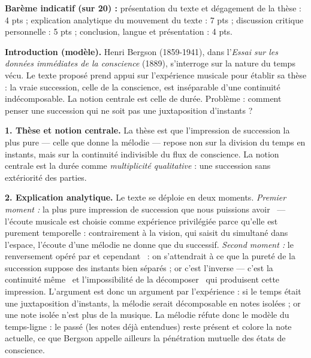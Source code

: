 \documentclass[11pt]{article}
\newcommand{\cle}[1]{{\popxbold\color{popdark}#1}}
\begin{document}
\begin{corrige}

\textbf{Barème indicatif (sur 20) :} présentation du texte et dégagement de la thèse : 4 pts ; explication analytique du mouvement du texte : 7 pts ; discussion critique personnelle : 5 pts ; conclusion, langue et présentation : 4 pts.

\textbf{Introduction (modèle).} Henri Bergson (1859-1941), dans l'\emph{Essai sur les données immédiates de la conscience} (1889), s'interroge sur la nature du temps vécu. Le texte proposé prend appui sur l'expérience musicale pour établir sa thèse : la vraie succession, celle de la conscience, est inséparable d'une continuité indécomposable. La notion centrale est celle de \cle{durée}. Problème : comment penser une succession qui ne soit pas une juxtaposition d'instants ?

\textbf{1. Thèse et notion centrale.} La thèse est que l'impression de succession la plus pure — celle que donne la mélodie — repose non sur la division du temps en instants, mais sur la continuité indivisible du flux de conscience. La notion centrale est la durée comme \emph{multiplicité qualitative} : une succession sans extériorité des parties.

\textbf{2. Explication analytique.} Le texte se déploie en deux moments. \emph{Premier moment :} \guillemotleft la plus pure impression de succession que nous puissions avoir \guillemotright\ — l'écoute musicale est choisie comme expérience privilégiée parce qu'elle est purement temporelle : contrairement à la vision, qui saisit du simultané dans l'espace, l'écoute d'une mélodie ne donne que du successif. \emph{Second moment :} le renversement opéré par \guillemotleft et cependant \guillemotright\ : on s'attendrait à ce que la pureté de la succession suppose des instants bien séparés ; or c'est l'inverse — c'est \guillemotleft la continuité même \guillemotright\ et \guillemotleft l'impossibilité de la décomposer \guillemotright\ qui produisent cette impression. L'argument est donc un argument par l'expérience : si le temps était une juxtaposition d'instants, la mélodie serait décomposable en notes isolées ; or une note isolée n'est plus de la musique. La mélodie réfute donc le modèle du temps-ligne : le passé (les notes déjà entendues) reste présent et colore la note actuelle, ce que Bergson appelle ailleurs la pénétration mutuelle des états de conscience.


\end{corrige}
\end{document}
